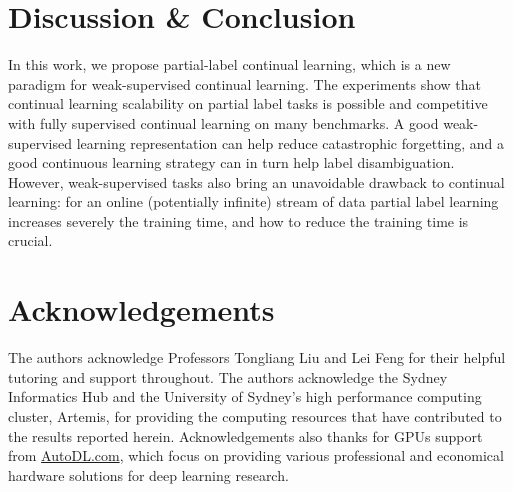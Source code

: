 \documentclass{article} %
\begin{document}
\section{Discussion \& Conclusion}
In this work, we propose partial-label continual learning, which is a new paradigm for weak-supervised continual learning. The experiments show that continual learning scalability on partial label tasks is possible and competitive with fully supervised continual learning on many benchmarks. A good weak-supervised learning representation can help reduce catastrophic forgetting, and a good continuous learning strategy can in turn help label disambiguation. However, weak-supervised tasks also bring an unavoidable drawback to continual learning: for an online (potentially infinite) stream of data partial label learning increases severely the training time, and how to reduce the training time is crucial. 

\section*{Acknowledgements}
The authors acknowledge Professors Tongliang Liu and Lei Feng for their helpful tutoring and support throughout. The authors acknowledge the Sydney Informatics Hub and the University of Sydney’s high performance computing cluster, Artemis, for providing the computing resources that have contributed to the results reported herein.
Acknowledgements also thanks for GPUs support from \url{AutoDL.com}, which focus on providing various professional and economical hardware solutions for deep learning research.

\newpage 



\newpage
\appendix
\end{document}
